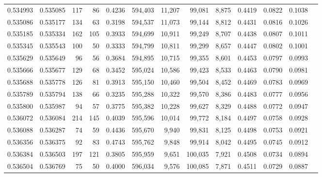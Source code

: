 \begin{tabular}{rrrrrrrrrrrrr}
0.534993 & 0.535085 &   117 &    86 &                                     0.4236 & 594,403 &  11,207 &  99,081 &   8,875 & 0.4419 & 0.0822 & 0.1038 \\
0.535086 & 0.535177 &   134 &    63 &                                     0.3198 & 594,537 &  11,073 &  99,144 &   8,812 & 0.4431 & 0.0816 & 0.1026 \\
0.535185 & 0.535334 &   162 &   105 &                                     0.3933 & 594,699 &  10,911 &  99,249 &   8,707 & 0.4438 & 0.0807 & 0.1011 \\
0.535345 & 0.535543 &   100 &    50 &                                     0.3333 & 594,799 &  10,811 &  99,299 &   8,657 & 0.4447 & 0.0802 & 0.1001 \\
0.535629 & 0.535649 &    96 &    56 &                                     0.3684 & 594,895 &  10,715 &  99,355 &   8,601 & 0.4453 & 0.0797 & 0.0993 \\
0.535666 & 0.535677 &   129 &    68 &                                     0.3452 & 595,024 &  10,586 &  99,423 &   8,533 & 0.4463 & 0.0790 & 0.0981 \\
0.535688 & 0.535778 &   126 &    81 &                                     0.3913 & 595,150 &  10,460 &  99,504 &   8,452 & 0.4469 & 0.0783 & 0.0969 \\
0.535789 & 0.535794 &   138 &    66 &                                     0.3235 & 595,288 &  10,322 &  99,570 &   8,386 & 0.4483 & 0.0777 & 0.0956 \\
0.535800 & 0.535987 &    94 &    57 &                                     0.3775 & 595,382 &  10,228 &  99,627 &   8,329 & 0.4488 & 0.0772 & 0.0947 \\
0.536072 & 0.536084 &   214 &   145 &                                     0.4039 & 595,596 &  10,014 &  99,772 &   8,184 & 0.4497 & 0.0758 & 0.0928 \\
0.536088 & 0.536287 &    74 &    59 &                                     0.4436 & 595,670 &   9,940 &  99,831 &   8,125 & 0.4498 & 0.0753 & 0.0921 \\
0.536356 & 0.536375 &    92 &    83 &                                     0.4743 & 595,762 &   9,848 &  99,914 &   8,042 & 0.4495 & 0.0745 & 0.0912 \\
0.536384 & 0.536503 &   197 &   121 &                                     0.3805 & 595,959 &   9,651 & 100,035 &   7,921 & 0.4508 & 0.0734 & 0.0894 \\
0.536504 & 0.536769 &    75 &    50 &                                     0.4000 & 596,034 &   9,576 & 100,085 &   7,871 & 0.4511 & 0.0729 & 0.0887 \\

\end{tabular}
